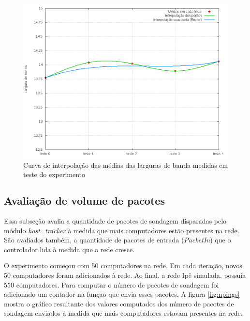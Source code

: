 \begin{figure}[!htb]
    \centering
    \label{fig:host_tracker-bandwidth-growth}
    \includegraphics[width=\linewidth]{img/host_tracker-bandwidth-growth}
    \caption{Curva de interpolação das médias das larguras de banda medidas 
    em teste do experimento}
\end{figure}

\subsection{Avaliação de volume de pacotes}

Essa subseção avalia a quantidade de pacotes de sondagem disparadas pelo 
módulo \emph{host\_tracker} à medida que mais computadores estão presentes
na rede.
São avaliados também, a quantidade de pacotes de entrada (\emph{PacketIn}) 
que o controlador lida à medida que a rede cresce.

O experimento começou com 50 computadores na rede.
Em cada iteração, novos 50 computadores foram adicionados à rede.
Ao final, a rede Ipê simulada, possuía 550 computadores.
Para computar o número de pacotes de sondagem foi adicionado um contador 
na funçao que envia esses pacotes.
A figura \ref{fig:npings} mostra o gráfico resultante dos valores computados
dos número de pacotes de sondagem enviados à medida que mais computadores 
estavam presentes na rede.

